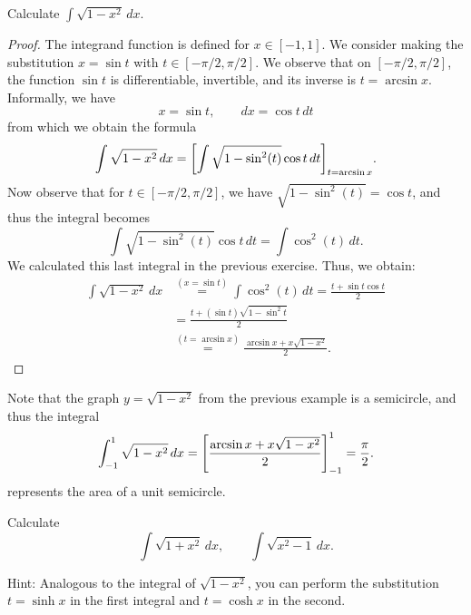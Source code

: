 \begin{example}
Calculate
$\int \sqrt{1-x^2}\, dx$.
\end{example}
\begin{proof}
The integrand function is defined for $x\in [-1,1]$. We consider making the
substitution $x=\sin t$ with $t\in [-\pi/2, \pi/2]$. We observe that on
$[-\pi/2,\pi/2]$, the function $\sin t$ is differentiable, invertible, and its
inverse is $t = \arcsin x$. Informally, we have
\[
 x= \sin t, \qquad dx = \cos t \, dt
\]
from which we obtain the formula
\[
 \int \sqrt{1-x^2}\, dx = {\left[ \int \sqrt{1-\sin^2(t)} \cos t\, dt \right]}_{t=\arcsin x}.
\]
Now observe that for $t\in [-\pi/2, \pi/2]$, we have $\sqrt{1-\sin^2(t)}=\cos
t$, and thus the integral becomes
\[
 \int \sqrt{1-\sin^2(t)}\cos t\, dt = \int \cos^2(t)\, dt.
\]
We calculated this last integral in the previous exercise. Thus, we obtain:
\begin{align*}
 \int \sqrt{1-x^2}\, dx
 &\stackrel{(x=\sin t)}= \int \cos^2(t)\, dt
 = \frac{t + \sin t \cos t}{2} \\
 &= \frac{t + (\sin t) \sqrt{1-\sin^2 t}}{2} \\
 &\stackrel{(t=\arcsin x)}= \frac{\arcsin x + x \sqrt{1-x^2}}{2}.
\end{align*}
\end{proof}

Note that the graph $y=\sqrt{1-x^2}$ from the previous example is a semicircle,
and thus the integral
\[
 \int_{-1}^1 \sqrt{1-x^2}\, dx = {\left[ \frac{\arcsin x +x\sqrt{1-x^2}}{2} \right]}_{-1}^{1}
 = \frac{\pi}{2}.
\]
represents the area of a unit semicircle.

\begin{exercise}
Calculate
\[
 \int \sqrt{1+x^2}\, dx, \qquad \int \sqrt{x^2-1}\, dx.  
\]

Hint: Analogous to the integral of $\sqrt{1-x^2}$, you can perform the
substitution $t=\sinh x$ in the first integral and $t=\cosh x$ in the second.
\end{exercise}


